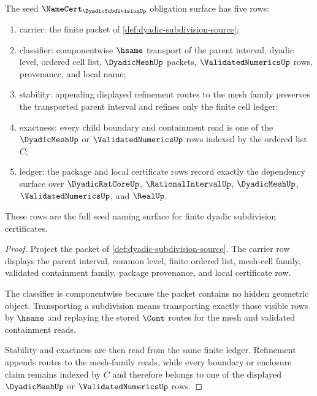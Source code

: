 \begin{theorem}
\label{thm:dyadic-subdivision-namecert-obligations}
The seed $\NameCert_{\DyadicSubdivisionUp}$ obligation surface has five rows:
\begin{enumerate}
\item carrier: the finite packet of \autoref{def:dyadic-subdivision-source};
\item classifier: componentwise $\hsame$ transport of the parent interval, dyadic level, ordered cell list, $\DyadicMeshUp$ packets, $\ValidatedNumericsUp$ rows, provenance, and local name;
\item stability: appending displayed refinement routes to the mesh family preserves the transported parent interval and refines only the finite cell ledger;
\item exactness: every child boundary and containment read is one of the $\DyadicMeshUp$ or $\ValidatedNumericsUp$ rows indexed by the ordered list $C$;
\item ledger: the package and local certificate rows record exactly the dependency surface over $\DyadicRatCoreUp$, $\RationalIntervalUp$, $\DyadicMeshUp$, $\ValidatedNumericsUp$, and $\RealUp$.
\end{enumerate}
These rows are the full seed naming surface for finite dyadic subdivision certificates.
\end{theorem}
\begin{proof}
Project the packet of \autoref{def:dyadic-subdivision-source}. The carrier row displays the parent interval, common level, finite ordered list, mesh-cell family, validated containment family, package provenance, and local certificate row.

The classifier is componentwise because the packet contains no hidden geometric object. Transporting a subdivision means transporting exactly those visible rows by $\hsame$ and replaying the stored $\Cont$ routes for the mesh and validated containment reads.

Stability and exactness are then read from the same finite ledger. Refinement appends routes to the mesh-family reads, while every boundary or enclosure claim remains indexed by $C$ and therefore belongs to one of the displayed $\DyadicMeshUp$ or $\ValidatedNumericsUp$ rows.
\end{proof}

